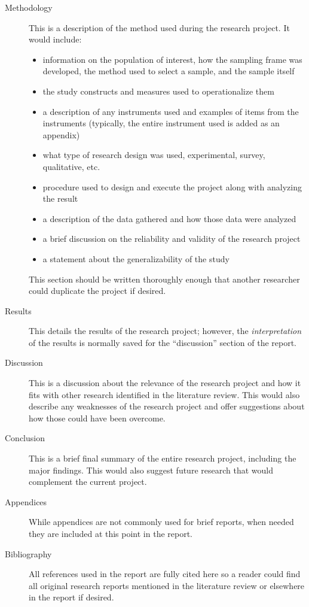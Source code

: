 \begin{description}
	\item[Methodology] This is a description of the method used during the research project. It would include: 
	
	\begin{itemize}
		\item information on the population of interest, how the sampling frame was developed, the method used to select a sample, and the sample itself
		\item the study constructs and measures used to operationalize them
		\item a description of any instruments used and examples of items from the instruments (typically, the entire instrument used is added as an appendix)
		\item what type of research design was used, \ie experimental, survey, qualitative, etc.
		\item procedure used to design and execute the project along with analyzing the result
		\item a description of the data gathered and how those data were analyzed
		\item a brief discussion on the reliability and validity of the research project
		\item a statement about the generalizability of the study
	\end{itemize}

	This section should be written thoroughly enough that another researcher could duplicate the project if desired.

	\item[Results] This details the results of the research project; however, the \textit{interpretation} of the results is normally saved for the ``discussion'' section of the report. 

	\item[Discussion] This is a discussion about the relevance of the research project and how it fits with other research identified in the literature review. This would also describe any weaknesses of the research project and offer suggestions about how those could have been overcome.

	\item[Conclusion] This is a brief final summary of the entire research project, including the major findings. This would also suggest future research that would complement the current project.

	\item[Appendices] While appendices are not commonly used for brief reports, when needed they are included at this point in the report.

	\item[Bibliography] All references used in the report are fully cited here so a reader could find all original research reports mentioned in the literature review or elsewhere in the report if desired.
	
\end{description}

